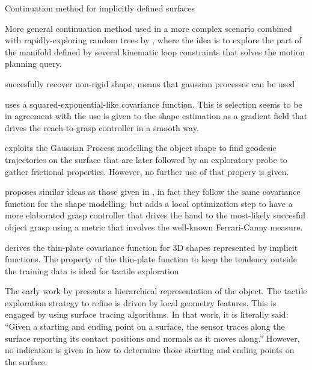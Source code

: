 \documentclass[twocolumn,draft,natbib]{svjour3}
\begin{document}
Continuation method for implicitly defined surfaces \citet{Henderson1993COMPUTING}

More general continuation method used in a more complex scenario combined with rapidly-exploring random trees \citep{LaValle2011Motion} by \citet{Jaillet2013Path}, where the idea is to explore the part of the manifold defined by several kinematic loop constraints that solves the motion planning query.

\citet{Zhu2009Nonrigid} succesfully recover non-rigid shape, means that gaussian processes can be used

\citet{Dragiev2011Gaussian} uses a squared-exponential-like covariance function. This is selection seems to be in agreement with the use is given to the shape estimation as a gradient field that drives the reach-to-grasp controller in a smooth way.

\citet{Rosales2014Active} exploits the Gaussian Process modelling the object shape to find geodesic trajectories on the surface that are later followed by an exploratory probe to gather frictional properties. However, no further use of that propery is given.

\citet{Mahler2015Grasp} proposes similar ideas as those given in \citet{Dragiev2011Gaussian}, in fact they follow the same covariance function for the shape modelling, but adds a local optimization step to have a more elaborated grasp controller that drives the hand to the most-likely succesful object grasp using a metric that involves the well-known Ferrari-Canny measure.

\citet{Williams2007Gaussian} derives the thin-plate covariance function for 3D shapes represented by implicit functions. The property of the thin-plate function to keep the tendency outside the training data is ideal for tactile exploration~\citep[Fig.~2]{Williams2007Gaussian}

The early work by \citet{Allen1987Robotic} presents a hierarchical representation of the object. The tactile exploration strategy to refine is driven by local geometry features. This is engaged by using surface tracing algorithms. In that work, it is literally said: ``Given a starting and ending point on a surface, the sensor traces along the surface reporting its contact positions and normals as it moves along.'' However, no indication is given in how to determine those starting and ending points on the surface.
\end{document}
